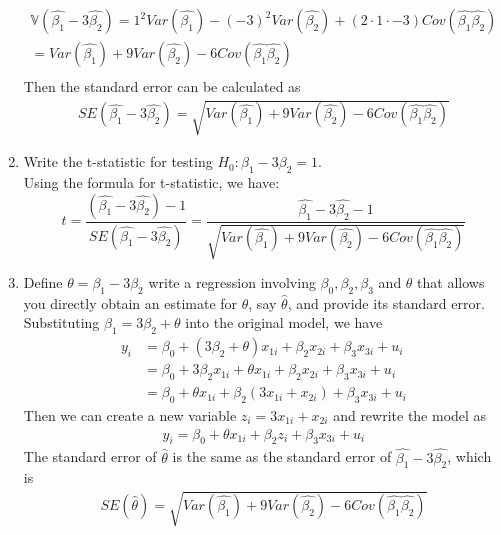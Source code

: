 \documentclass[12pt]{article}
\begin{document}
\begin{flushleft}
\begin{enumerate}
    \begin{align*}
        \mathbb{V}(\hat{\beta_1}-3\hat{\beta_2})=1^2Var(\hat{\beta_1})-(-3)^2Var(\hat{\beta_2})+(2\cdot 1 \cdot-3)Cov(\hat{\beta_1}\hat{\beta_2})\\=Var(\hat{\beta_1})+9Var(\hat{\beta_2})-6Cov(\hat{\beta_1}\hat{\beta_2})\\
    \end{align*}
    Then the standard error can be calculated as
    \begin{align*}
        SE(\hat{\beta_1}-3\hat{\beta_2})=\sqrt{Var(\hat{\beta_1})+9Var(\hat{\beta_2})-6Cov(\hat{\beta_1}\hat{\beta_2})} 
    \end{align*}

    \item Write the t-statistic for testing $H_0:\beta_1-3\beta_2=1$.\\
    Using the formula for t-statistic, we have:
    \begin{equation*}
         t=\frac{(\hat{\beta_1}-3\hat{\beta_2})-1}{SE(\hat{\beta_1}-3\hat{\beta_2})}
         =\frac{\hat{\beta_1}-3\hat{\beta_2}-1}{\sqrt{Var(\hat{\beta_1})+9Var(\hat{\beta_2})-6Cov(\hat{\beta_1}\hat{\beta_2})}}
    \end{equation*}
    \item Define $\theta=\beta_1-3\beta_2$ write a regression involving $\beta_0,\beta_2,\beta_3$ and $\theta$ that allows you directly obtain an estimate for $\theta$, say $\hat{\theta}$, and provide its standard error.\\
    Substituting $\beta_1=3\beta_2+\theta$ into the original model, we have
    \begin{align*}
        y_i&=\beta_0+(3\beta_2+\theta)x_{1i}+\beta_2x_{2i}+\beta_3x_{3i}+u_i\\
        &=\beta_0+3\beta_2x_{1i}+\theta x_{1i}+\beta_2x_{2i}+\beta_3x_{3i}+u_i\\
        &=\beta_0+\theta x_{1i}+\beta_2(3x_{1i}+x_{2i})+\beta_3x_{3i}+u_i
    \end{align*}
    Then we can create a new variable $z_i=3x_{1i}+x_{2i}$ and rewrite the model as
    \begin{align*}
        y_i=\beta_0+\theta x_{1i}+\beta_2z_i+\beta_3x_{3i}+u_i
    \end{align*}
    The standard error of $\hat{\theta}$ is the same as the standard error of $\hat{\beta_1}-3\hat{\beta_2}$, which is
    \begin{align*}
        SE(\hat{\theta})=\sqrt{Var(\hat{\beta_1})+9Var(\hat{\beta_2})-6Cov(\hat{\beta_1}\hat{\beta_2})}
    \end{align*}
\end{enumerate}

\end{flushleft}
\end{document}
